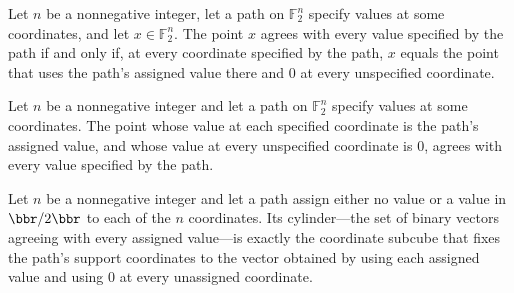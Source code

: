 \begin{theorem}
\leanok
{}
Let $n$ be a nonnegative integer, let a path on $\mathbb{F}_2^n$ specify values at some
coordinates, and let $x\in\mathbb{F}_2^n$. The point $x$ agrees with every value
specified by the path if and only if, at every coordinate specified by the path, $x$
equals the point that uses the path's assigned value there and $0$ at every unspecified
coordinate.
\end{theorem}

\begin{theorem}
\leanok
{}
Let $n$ be a nonnegative integer and let a path on $\mathbb{F}_2^n$ specify values at
some coordinates. The point whose value at each specified coordinate is the path's
assigned value, and whose value at every unspecified coordinate is $0$, agrees with
every value specified by the path.
\end{theorem}

\begin{theorem}
\leanok
{}
Let $n$ be a nonnegative integer and let a path assign either no value or a value in
$\bbr/2\bbr$ to each of the $n$ coordinates. Its cylinder—the set of binary vectors
agreeing with every assigned value—is exactly the coordinate subcube that fixes the
path’s support coordinates to the vector obtained by using each assigned value and using
$0$ at every unassigned coordinate.
\end{theorem}

